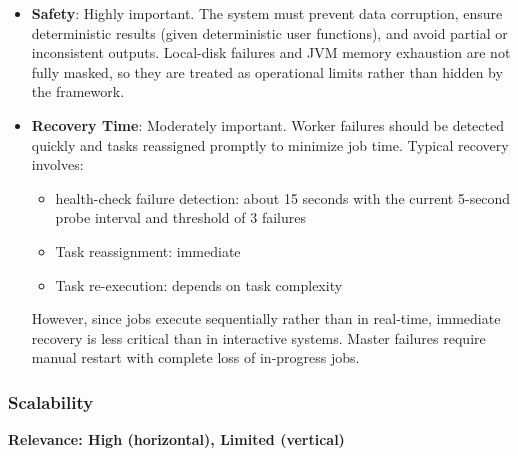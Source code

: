 \documentclass{scrartcl}
\begin{document}
\begin{itemize}
    \item \textbf{Safety}: Highly important. The system must prevent data corruption, ensure deterministic results (given deterministic user functions), and avoid partial or inconsistent outputs. Local-disk failures and JVM memory exhaustion are not fully masked, so they are treated as operational limits rather than hidden by the framework.
    \item \textbf{Recovery Time}: Moderately important. Worker failures should be detected quickly and tasks reassigned promptly to minimize job time. Typical recovery involves:
          \begin{itemize}
              \item health-check failure detection: about 15 seconds with the current 5-second probe interval and threshold of 3 failures
              \item Task reassignment: immediate
              \item Task re-execution: depends on task complexity
          \end{itemize}
          However, since jobs execute sequentially rather than in real-time, immediate recovery is less critical than in interactive systems. Master failures require manual restart with complete loss of in-progress jobs.
\end{itemize}

\subsubsection{Scalability}

\textbf{Relevance: High (horizontal), Limited (vertical)}
\end{document}
